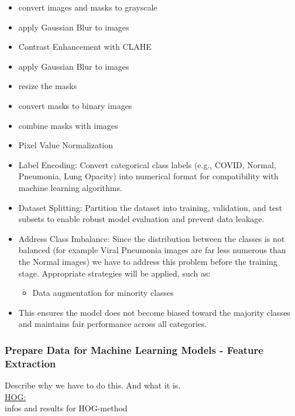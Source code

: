\documentclass{article}
\begin{document}
\begin{itemize}
    \item convert images and masks to grayscale
    \item apply Gaussian Blur to images
    \item Contrast Enhancement with CLAHE
    \item apply Gaussian Blur to images
    \item resize the masks 
    \item convert masks to binary images
    \item combine masks with images
    \item Pixel Value Normalization
    \item Label Encoding: Convert categorical class labels (e.g., COVID, Normal, Pneumonia, Lung Opacity) into numerical format for compatibility with machine learning algorithms.
    \item Dataset Splitting: Partition the dataset into training, validation, and test subsets to enable robust model evaluation and prevent data leakage.
    \item Address Class Imbalance: Since the distribution between the classes is not balanced (for example Viral Pneumonia images are far less numerous than the Normal images) we have to address this problem before the training stage. Appropriate strategies will be applied, such as:
    \begin{itemize}
        \item Data augmentation for minority classes
    \end{itemize}
    \item This ensures the model does not become biased toward the majority classes and maintains fair performance across all categories.
\end{itemize}



\subsubsection{Prepare Data for Machine Learning Models - Feature Extraction}
Describe why we have to do this. And what it is. 
\\

\underline{HOG:}\\
infos and results for HOG-method
\\
\end{document}
